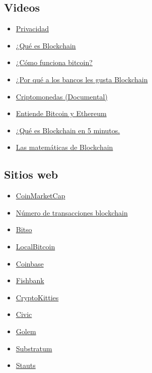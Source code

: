 \documentclass[a4paper,12pt]{lib/pub}
\begin{document}
\subsection{Videos}
\begin{itemize}
	\item \href{https://www.youtube.com/watch?v=RSj9QQMPMWg}{Privacidad}
	\item \href{https://www.youtube.com/watch?v=E2QT9RHmNsY}{¿Qué es Blockchain}	
	\item \href{https://www.youtube.com/watch?v=t5JGQXCTe3c}{¿Cómo funciona bitcoin?}
	\item \href{https://www.youtube.com/watch?v=DAjtCmA-vxE\&feature=youtu.be}{¿Por qué a los bancos les gusta Blockchain}
	\item \href{https://www.youtube.com/watch?v=S00MWI3YeP4\&pbjreload=10}{Criptomonedas (Documental)}
	\item \href{https://www.youtube.com/watch?v=YBNr69vrscw\&list=PLgo3Qtdm2bOMKyzFGy-B3MiDAGPIeqbKP}{Entiende Bitcoin y Ethereum}
	\item \href{https://www.youtube.com/watch?v=Yn8WGaO\_\_ak\&list=PLgo3Qtdm2bOMKyzFGy-B3MiDAGPIeqbKP\&index=2}{¿Qué es Blockchain en 5 minutos.}
	\item \href{https://www.youtube.com/watch?v=b5dhq3dSG2k}{Las matemáticas de Blockchain}
\end{itemize}

\subsection{Sitios web}
\begin{itemize}
	\item \href{https://coinmarketcap.com/}{CoinMarketCap}
	\item \href{https://www.blockchain.com/charts/n-transactions?timespan=all}{Número de transacciones blockchain}
	\item \href{https://bitso.com/}{Bitso}
	\item \href{https://localbitcoins.com/}{LocalBitcoin}
	\item \href{https://www.coinbase.com/}{Coinbase}
	\item \href{https://fishbank.io/n/?r=1}{Fishbank}
	\item \href{https://www.cryptokitties.co/}{CryptoKitties}
	\item \href{https://www.civic.com/}{Civic}
	\item \href{https://golem.network/}{Golem}
	\item \href{https://substratum.net/}{Substratum}
	\item \href{https://status.im/}{Stauts}
\end{itemize}
\end{document}
